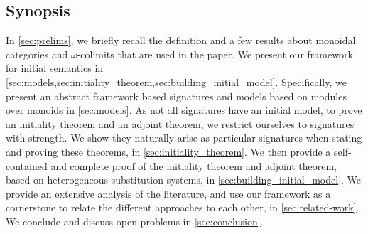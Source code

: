 \subsection{Synopsis}
\label{sec:synopsis}

%
In \cref{sec:prelims}, we briefly recall the definition and a few results about
monoidal categories and $ω$-colimits that are used in the paper.
%
We present our framework for initial semantics in
\cref{sec:models,sec:initiality_theorem,sec:building_initial_model}.
%
Specifically, we present an abstract framework based signatures and models based
on modules over monoids in \cref{sec:models}.
%
As not all signatures have an initial model, to prove an initiality theorem and
an adjoint theorem, we restrict ourselves to signatures with strength.
We show they naturally arise as particular signatures when stating and
proving these theorems, in \cref{sec:initiality_theorem}.
%
We then provide a self-contained and complete proof of the initiality theorem
and adjoint theorem, based on heterogeneous substitution systems, in
\cref{sec:building_initial_model}.
%
We provide an extensive analysis of the literature, and use our framework as a
cornerstone to relate the different approaches to each other, in \cref{sec:related-work}.
%
We conclude and discuss open problems in \cref{sec:conclusion}.
